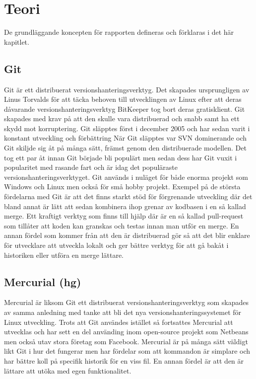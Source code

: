 \section{Teori}
\label{sec:bjorn-theory}
De grundläggande koncepten för rapporten defineras och förklaras i det här kapitlet.

\subsection{Git}
Git är ett distribuerat versionshanteringsverktyg. Det skapades ursprungligen av Linus Torvalds för att täcka behoven till utvecklingen av Linux efter att deras dåvarande versionshanteringsverktyg BitKeeper tog bort deras gratisklient. Git skapades med krav på att den skulle vara distribuerad och snabb samt ha ett skydd mot korruptering. Git släpptes först i december 2005 och har sedan varit i konstant utveckling och förbättring \cite{linux-google} När Git släpptes var SVN dominerande och Git skiljde sig åt på många sätt, främst genom den distribuerade modellen. Det tog ett par åt innan Git började bli populärt men sedan dess har Git vuxit i popularitet med rasande fart och är idag det populäraste versionshanteringsverktyget. Git används i nuläget för både enorma projekt som Windows och Linux men också för små hobby projekt.\cite{vcs-popularity}
Exempel på de största fördelarna med Git är att det finns starkt stöd för förgrenande utveckling där det bland annat är lätt att sedan kombinera ihop grenar av kodbasen i en så kallad merge. Ett kraftigt verktyg som finns till hjälp där är en så kallad pull-request som tillåter att koden kan granskas och testas innan man utför en merge.\cite{pull-request} En annan fördel som kommer från att den är distribuerad gör så att det blir enklare för utvecklare att utveckla lokalt och ger bättre verktyg för att gå bakåt i historiken eller utföra en merge lättare.

\subsection{Mercurial (hg)}
Mercurial är liksom Git ett distribuerat versionshanteringsverktyg som skapades av samma anledning med tanke att bli det nya versionshanteringssystemet för Linux utveckling. Trots att Git användes istället så fortsattes Mercurial att utvecklas och har sett en del använding inom open-source projekt som Netbeans\cite{netbeans-contribute} men också utav stora företag som Facebook\cite{facebook-mercurial}.
Mercurial är på många sätt väldigt likt Git i hur det fungerar men har fördelar som att kommandon är simplare och har bättre koll på specifik historik för en viss fil. En annan fördel är att den är lättare att utöka med egen funktionalitet.\cite{mercurial-book}


